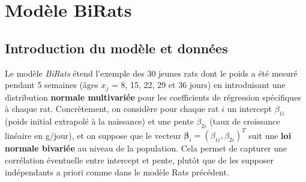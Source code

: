 \documentclass[12pt]{article}
\begin{document}
\section{Modèle BiRats}

\subsection{Introduction du modèle et données} 

Le modèle \emph{BiRats} étend l’exemple des 30 jeunes rats dont le poids a été mesuré pendant 5 semaines (âges $x_{j}$ = 8, 15, 22, 29 et 36 jours) en introduisant une distribution \textbf{normale multivariée} pour les coefficients de régression spécifiques à chaque rat. Concrètement, on considère pour chaque rat $i$ un intercept $\beta_{1i}$ (poids initial extrapolé à la naissance) et une pente $\beta_{2i}$ (taux de croissance linéaire en g/jour), et on suppose que le vecteur $\boldsymbol{\beta}_{i}=(\beta_{1i},\beta_{2i})^T$ suit une \textbf{loi normale bivariée} au niveau de la population. Cela permet de capturer une corrélation éventuelle entre intercept et pente, plutôt que de les supposer indépendants a priori comme dans le modèle \og Rats \fg{} précédent.
\end{document}
